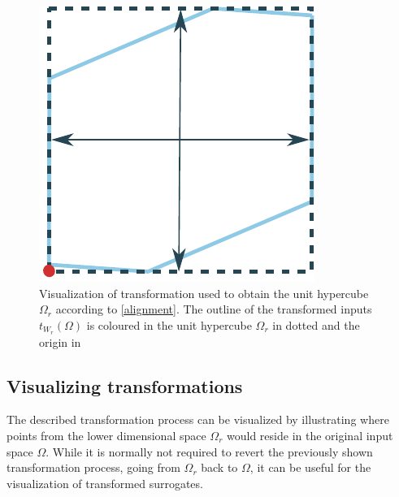 \documentclass[
  a4paper,  %
  twoside,  %
  bibliography=totoc,
  headsepline,
  cleardoublepage=empty,
  parskip=half,
  draft=false
]{scrbook}
\begin{document}
\begin{mdframed}[style=style]
\begin{figure}[H]
        \centering
\begin{minipage}{.49\textwidth}
        \centering
  \caption{Visualization of transformation used to obtain the unit hypercube $\Omega_r$ according to \cref{alignment}.
  The outline of the transformed inputs $t_{W_r}(\Omega)$ is coloured in \lightbluecomma the unit hypercube $\Omega_r$ in dotted \darkbluecomma and the origin in \reddot}
  \label{fig:aligned}
    \end{minipage}%
    \begin{minipage}{0.49\textwidth}
        \centering
   \includegraphics[width=0.7\linewidth]{graphics/surrogate_space_unit}
    \end{minipage}
\end{figure}
\end{mdframed}


\subsection{Visualizing transformations}
\label{sec:vis_trans}

The described transformation process can be visualized by illustrating where points from the lower dimensional space $\Omega_r$ would reside in the original input space $\Omega$.
While it is normally not required to revert the previously shown transformation process, \ie going from $\Omega_r$ back to $\Omega$, it can be useful for the visualization of transformed surrogates.
\end{document}
